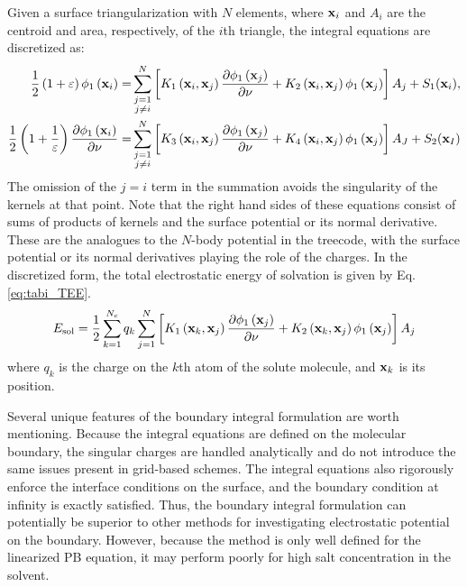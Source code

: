 \documentclass[11pt,titlepage]{article}
\begin{document}
Given a surface triangularization with $N$ elements, where ${\bf x}_i$ and $A_i$ are the centroid and area, respectively, of the $i$th triangle, the integral equations are discretized as:
%
\begin{equation}
\begin{split}
\frac{1}{2}\left(1+\varepsilon\right)\phi_1\left({\bf x}_i\right) =& \sum_{\substack{j=1 \\ j\neq i}}^N \left[K_1\left({\bf x}_i, {\bf x}_j\right) \frac{\partial \phi_1\left({\bf x}_j\right)}{\partial \nu} + K_2\left({\bf x}_i, {\bf x}_j\right) \phi_1\left({\bf x}_j\right) \right]A_j + S_1({\bf x}_i), \\ %
\frac{1}{2}\left(1+\frac{1}{\varepsilon}\right) \frac{\partial \phi_1\left({\bf x}_i\right)}{\partial \nu} =& \sum_{\substack{j=1 \\ j\neq i}}^N \left[K_3\left({\bf x}_i, {\bf x}_j\right) \frac{\partial \phi_1\left({\bf x}_j\right)}{\partial \nu} + K_4\left({\bf x}_i, {\bf x}_j\right) \phi_1\left({\bf x}_j\right) \right]A_J + S_2({\bf x}_I)
\end{split}
\end{equation}
%
The omission of the $j=i$ term in the summation avoids the singularity of the kernels at that point. Note that the right hand sides of these equations consist of sums of products of kernels and the surface potential or its normal derivative. These are the analogues to the $N$-body potential in the treecode, with the surface potential or its normal derivatives playing the role of the charges. In the discretized form, the total electrostatic energy of solvation is given by Eq. \ref{eq:tabi_TEE}.
%
\begin{equation}
E_\text{sol}=\frac{1}{2}\sum_{k=1}^{N_c}q_k\sum_{j=1}^N \left[K_1\left({\bf x}_k, {\bf x}_j\right) \frac{\partial \phi_1\left({\bf x}_j\right)}{\partial \nu} + K_2\left({\bf x}_k, {\bf x}_j\right) \phi_1\left({\bf x}_j\right) \right]A_j
\label{eq:tabi_TEE}
\end{equation}
%
where $q_k$ is the charge on the $k$th atom of the solute molecule, and ${\bf x}_k$ is its position.

Several unique features of the boundary integral formulation are worth mentioning. Because the integral equations are defined on the molecular boundary, the singular charges are handled analytically and do not introduce the same issues present in grid-based schemes. The integral equations also rigorously enforce the interface conditions on the surface, and the boundary condition at infinity is exactly satisfied. Thus, the boundary integral formulation can potentially be superior to other methods for investigating electrostatic potential on the boundary. However, because the method is only well defined for the linearized PB equation, it may perform poorly for high salt concentration in the solvent.
\end{document}
